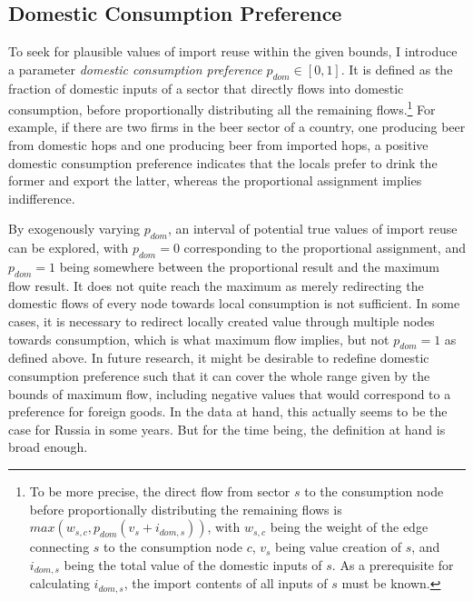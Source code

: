 \documentclass[english]{uzhpub}
\begin{document}
\subsection{Domestic Consumption Preference}
To seek for plausible values of import reuse within the given bounds, I introduce a parameter \emph{domestic consumption preference} $p_{dom} \in [0,1]$. It is defined as the fraction of domestic inputs of a sector that directly flows into domestic consumption, before proportionally distributing all the remaining flows.\footnote{To be more precise, the direct flow from sector $s$ to the consumption node before proportionally distributing the remaining flows is $max(w_{s,c}, p_{dom} (v_s + i_{dom,s}))$, with $w_{s,c}$ being the weight of the edge connecting $s$ to the consumption node $c$, $v_s$ being value creation of $s$, and $i_{dom,s}$ being the total value of the domestic inputs of $s$. As a prerequisite for calculating $i_{dom,s}$, the import contents of all inputs of $s$ must be known.} For example, if there are two firms in the beer sector of a country, one producing beer from domestic hops and one producing beer from imported hops, a positive domestic consumption preference indicates that the locals prefer to drink the former and export the latter, whereas the proportional assignment implies indifference.

By exogenously varying $p_{dom}$, an interval of potential true values of import reuse can be explored, with $p_{dom}=0$ corresponding to the proportional assignment, and $p_{dom}=1$ being somewhere between the proportional result and the maximum flow result. It does not quite reach the maximum as merely redirecting the domestic flows of every node towards local consumption is not sufficient. In some cases, it is necessary to redirect locally created value through multiple nodes towards consumption, which is what maximum flow implies, but not $p_{dom}=1$ as defined above. In future research, it might be desirable to redefine domestic consumption preference such that it can cover the whole range given by the bounds of maximum flow, including negative values that would correspond to a preference for foreign goods. In the data at hand, this actually seems to be the case for Russia in some years. But for the time being, the definition at hand is broad enough.
\end{document}

